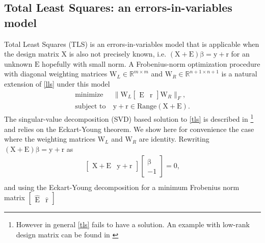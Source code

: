 \documentclass[10pt,a4paper]{article}
\theoremstyle{plain}
\theoremstyle{definition}
\newcommand{\boldvec}[1]{\boldsymbol{\mathrm{#1}}}
\let\vec\boldvec
\newcommand{\designMat}{\vec{X}} %
\newcommand{\observations}{\vec{y}} %
\newcommand{\param}{\vec{\beta}} %
\newcommand{\residual}{\vec{r}} %
\newcommand{\weightingMat}{\vec{W}} %
\newcommand{\errorMat}{\vec{E}} %
\begin{document}
\subsection{Total Least Squares: an errors-in-variables model}

Total Least Squares (TLS) is an errors-in-variables model that is applicable when the design matrix $\designMat$ is also not precisely known,
i.e. $(\designMat + \errorMat)\param = \observations + \residual$ for an unknown $\errorMat$ hopefully with small norm. A Frobenius-norm optimization procedure with diagonal weighting matrices $\weightingMat_{L} \in \mathbb{R}^{m \times m}$ and $\weightingMat_{R} \in \mathbb{R}^{n+1 \times n+1}$ is a natural extension of \ref{lls} under this model
%
\begin{equation}
\begin{aligned}
\text{minimize} &\ \| \weightingMat_{L} \begin{bmatrix} \errorMat & \residual \end{bmatrix} \weightingMat_{R} \|_{F}, \\
\text{subject to} &\ \observations + \residual \in \text{Range}(\designMat + \errorMat).
\end{aligned}
\label{tls}
\end{equation}
%
\noindent The singular-value decomposition (SVD) based solution to \eqref{tls} is described in \cite{Golub80} \footnote{However in general \ref{tls} fails to have a solution. An example with low-rank design matrix can be found in \cite{Golub80}} and relies on the Eckart-Young theorem. We show here for convenience the case where the weighting matrices $\weightingMat_{L}$ and $\weightingMat_{R}$ are identity. Rewriting $(\designMat + \errorMat)\param = \observations + \residual$ as  
%
\begin{equation}
\begin{aligned}
\begin{bmatrix} \designMat + \errorMat & \observations + \residual \end{bmatrix} \begin{bmatrix} \param \\ -1 \end{bmatrix} = 0, \\
\end{aligned}
\end{equation}
%
\noindent and using the Eckart-Young decomposition for a minimum Frobenius norm matrix $\begin{bmatrix} \hat{\errorMat} & \hat{\residual} \end{bmatrix}$%
%
\end{document}
